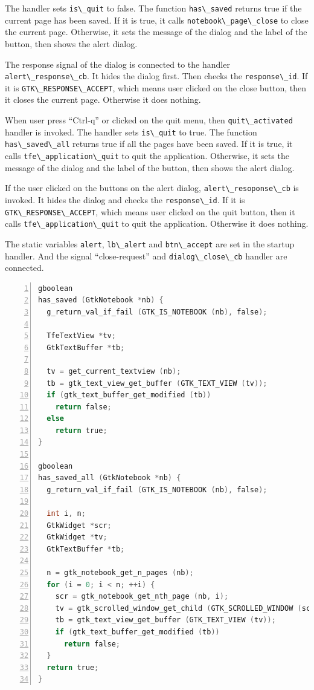 The handler sets \passthrough{\lstinline!is\_quit!} to false. The
function \passthrough{\lstinline!has\_saved!} returns true if the
current page has been saved. If it is true, it calls
\passthrough{\lstinline!notebook\_page\_close!} to close the current
page. Otherwise, it sets the message of the dialog and the label of the
button, then shows the alert dialog.

The response signal of the dialog is connected to the handler
\passthrough{\lstinline!alert\_response\_cb!}. It hides the dialog
first. Then checks the \passthrough{\lstinline!response\_id!}. If it is
\passthrough{\lstinline!GTK\_RESPONSE\_ACCEPT!}, which means user
clicked on the close button, then it closes the current page. Otherwise
it does nothing.

When user press ``Ctrl-q'' or clicked on the quit menu, then
\passthrough{\lstinline!quit\_activated!} handler is invoked. The
handler sets \passthrough{\lstinline!is\_quit!} to true. The function
\passthrough{\lstinline!has\_saved\_all!} returns true if all the pages
have been saved. If it is true, it calls
\passthrough{\lstinline!tfe\_application\_quit!} to quit the
application. Otherwise, it sets the message of the dialog and the label
of the button, then shows the alert dialog.

If the user clicked on the buttons on the alert dialog,
\passthrough{\lstinline!alert\_resoponse\_cb!} is invoked. It hides the
dialog and checks the \passthrough{\lstinline!response\_id!}. If it is
\passthrough{\lstinline!GTK\_RESPONSE\_ACCEPT!}, which means user
clicked on the quit button, then it calls
\passthrough{\lstinline!tfe\_application\_quit!} to quit the
application. Otherwise it does nothing.

The static variables \passthrough{\lstinline!alert!},
\passthrough{\lstinline!lb\_alert!} and
\passthrough{\lstinline!btn\_accept!} are set in the startup handler.
And the signal ``close-request'' and
\passthrough{\lstinline!dialog\_close\_cb!} handler are connected.

\begin{lstlisting}[language=C, numbers=left]
gboolean
has_saved (GtkNotebook *nb) {
  g_return_val_if_fail (GTK_IS_NOTEBOOK (nb), false);

  TfeTextView *tv;
  GtkTextBuffer *tb;

  tv = get_current_textview (nb);
  tb = gtk_text_view_get_buffer (GTK_TEXT_VIEW (tv));
  if (gtk_text_buffer_get_modified (tb))
    return false;
  else
    return true;
}

gboolean
has_saved_all (GtkNotebook *nb) {
  g_return_val_if_fail (GTK_IS_NOTEBOOK (nb), false);

  int i, n;
  GtkWidget *scr;
  GtkWidget *tv;
  GtkTextBuffer *tb;

  n = gtk_notebook_get_n_pages (nb);
  for (i = 0; i < n; ++i) {
    scr = gtk_notebook_get_nth_page (nb, i);
    tv = gtk_scrolled_window_get_child (GTK_SCROLLED_WINDOW (scr));
    tb = gtk_text_view_get_buffer (GTK_TEXT_VIEW (tv));
    if (gtk_text_buffer_get_modified (tb))
      return false;
  }
  return true;
}
\end{lstlisting}

